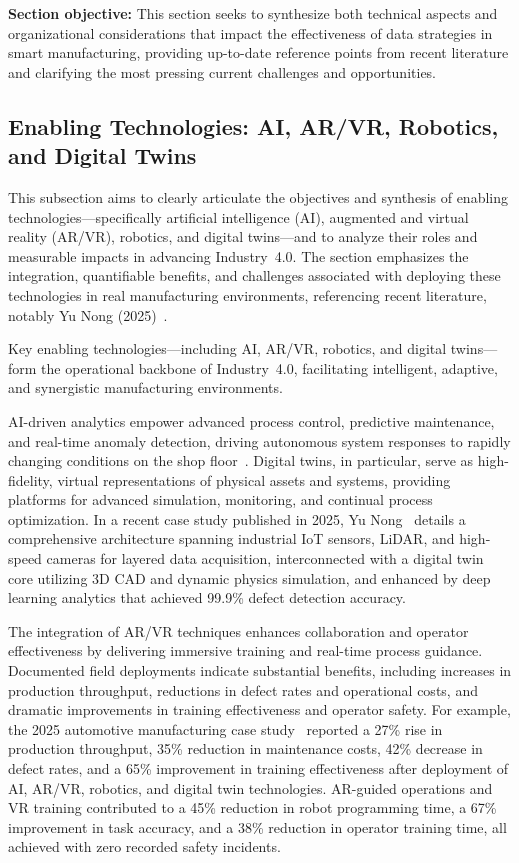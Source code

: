 \documentclass[sigconf]{acmart}
\begin{document}
\textbf{Section objective:} This section seeks to synthesize both technical aspects and organizational considerations that impact the effectiveness of data strategies in smart manufacturing, providing up-to-date reference points from recent literature and clarifying the most pressing current challenges and opportunities.

\subsection{Enabling Technologies: AI, AR/VR, Robotics, and Digital Twins}

This subsection aims to clearly articulate the objectives and synthesis of enabling technologies—specifically artificial intelligence (AI), augmented and virtual reality (AR/VR), robotics, and digital twins—and to analyze their roles and measurable impacts in advancing Industry~4.0. The section emphasizes the integration, quantifiable benefits, and challenges associated with deploying these technologies in real manufacturing environments, referencing recent literature, notably Yu Nong (2025)~\cite{ref23}.

Key enabling technologies—including AI, AR/VR, robotics, and digital twins—form the operational backbone of Industry~4.0, facilitating intelligent, adaptive, and synergistic manufacturing environments.

AI-driven analytics empower advanced process control, predictive maintenance, and real-time anomaly detection, driving autonomous system responses to rapidly changing conditions on the shop floor~\cite{ref23}. Digital twins, in particular, serve as high-fidelity, virtual representations of physical assets and systems, providing platforms for advanced simulation, monitoring, and continual process optimization. In a recent case study published in 2025, Yu Nong~\cite{ref23} details a comprehensive architecture spanning industrial IoT sensors, LiDAR, and high-speed cameras for layered data acquisition, interconnected with a digital twin core utilizing 3D CAD and dynamic physics simulation, and enhanced by deep learning analytics that achieved 99.9\% defect detection accuracy.

The integration of AR/VR techniques enhances collaboration and operator effectiveness by delivering immersive training and real-time process guidance. Documented field deployments indicate substantial benefits, including increases in production throughput, reductions in defect rates and operational costs, and dramatic improvements in training effectiveness and operator safety. For example, the 2025 automotive manufacturing case study~\cite{ref23} reported a 27\% rise in production throughput, 35\% reduction in maintenance costs, 42\% decrease in defect rates, and a 65\% improvement in training effectiveness after deployment of AI, AR/VR, robotics, and digital twin technologies. AR-guided operations and VR training contributed to a 45\% reduction in robot programming time, a 67\% improvement in task accuracy, and a 38\% reduction in operator training time, all achieved with zero recorded safety incidents.
\end{document}
